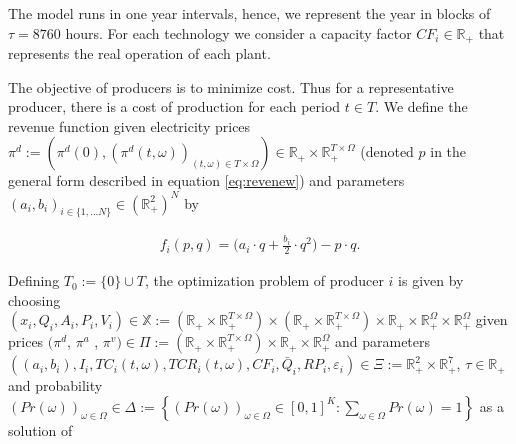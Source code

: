 \documentclass[11pt, letterpaper]{article}
\begin{document}
\smallskip
The model runs in one year intervals, hence, we represent the year in blocks of $\tau=8760$ hours. For each technology we consider a capacity factor $CF_i\in\mathbb{R}_+$ that represents the real operation of each plant.


The objective of producers is to minimize cost. Thus for a representative producer, there is a cost of production for each period $t\in T$. We define the revenue function given electricity prices $\pi^d:=\left(\pi^d(0),\left(\pi^d(t,\omega)\right)_{(t,\omega)\in T\times\Omega}\right)\in\mathbb{R}_+\times\mathbb{R}_+^{T\times\Omega}$ (denoted $p$ in the general form described in equation \ref{eq:revenew}) and parameters $(a_i,b_i)_{i\in\{1,...N\}}\in(\mathbb{R}^2_+)^N$ by

\begin{align}\label{eq:revenew}
f_i(p,q)=\Big(a_i\cdot q+\frac{b_i}{2}\cdot q^{2}\Big)-p\cdot q. 
\end{align}

Defining $T_0:=\{0\}\cup T$, the optimization problem of producer $i$ is given by choosing \linebreak$(x_i,Q_i, A_i,P_i,V_i)\in\mathbb{X}:=\left(\mathbb{R}_+\times\mathbb{R}_+^{T\times\Omega}\right) \times\left(\mathbb{R}_+\times\mathbb{R}_+^{T\times\Omega}\right) \times \mathbb{R}_+\times\mathbb{R}_+^{\Omega}\times\mathbb{R}_+^{\Omega}$ given prices \linebreak$(\pi^d$, $\pi^a$ , $\pi^v)\in\Pi:=\left(\mathbb{R}_+\times\mathbb{R}_+^{T\times\Omega}\right)\times\mathbb{R}_+\times\mathbb{R}^{\Omega}_+$ and parameters \linebreak$\left((a_i,b_i),I_i, TC_i(t,\omega), TCR_i(t,\omega), CF_i,\bar{Q}_i, RP_i , \varepsilon_i\right)\in \Xi:=\mathbb{R}_+^2\times\mathbb{R}_+^7$, $\tau\in \mathbb{R}_+$ and probability $(Pr(\omega))_{\omega\in\Omega}\in\Delta:=\left\{\left(Pr(\omega)\right)_{\omega\in\Omega}\in[0,1]^K:\sum_{\omega\in\Omega}Pr(\omega)=1\right\}$ as a solution of
\end{document}
